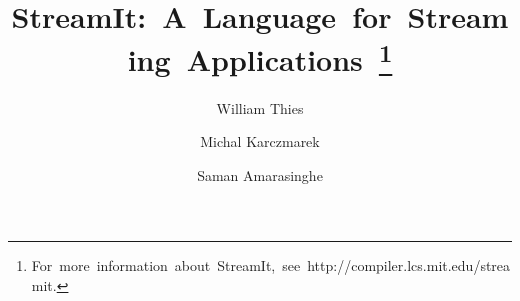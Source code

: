 \documentclass[runningheads]{llncs}
\begin{document}
\pagestyle{headings}

\mainmatter

\title{\mbox{StreamIt:  A Language for Streaming Applications
\thanks{\mbox{For more information about StreamIt, see http://compiler.lcs.mit.edu/streamit.}}}}


\author{William Thies 
	\and Michal Karczmarek 
	\and Saman Amarasinghe}



\maketitle

\begin{abstract}

\end{abstract}




%







%
\end{document}
